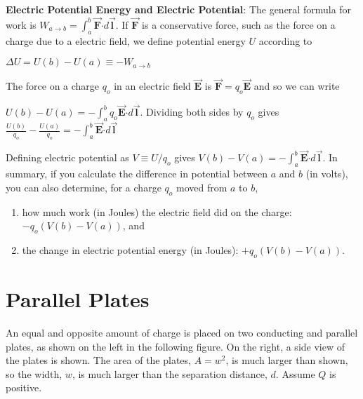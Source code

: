 \documentclass{article}
\newcommand{\ds}[0]{\displaystyle}
\newcommand{\bfvec}[1]{\vec{\mathbf{#1}}}
\newcommand{\bfcdot}[0]{\boldsymbol{\cdot}}
\begin{document}
\textbf{Electric Potential Energy and Electric Potential}: The general formula for work is $W_{a\rightarrow b}=\int_a^b \bfvec{F}\bfcdot d\bfvec{l}$. If $\bfvec{F}$ is a conservative force, such as the force on a charge due to a electric field, we define potential energy $U$ according to

$\Delta U = U(b)-U(a) \equiv -W_{a\rightarrow b}$

The force on a charge $q_o$ in an electric field $\bfvec{E}$ is $\bfvec{F}=q_o\bfvec{E}$ and so we can write

$\ds U(b)-U(a) = -\int_a^b q_o\bfvec{E}\bfcdot d\bfvec{l}$. Dividing both sides by $q_o$ gives $\ds\frac{U(b)}{q_o}-\frac{U(a)}{q_o} = -\int_a^b\bfvec{E}\bfcdot d\bfvec{l}$

Defining electric potential as $V\equiv U/q_o$ gives $V(b)-V(a) = -\int_a^b\bfvec{E}\bfcdot d\bfvec{l}$. In summary, if you calculate the difference in potential between $a$ and $b$ (in volts), you can also determine, for a charge $q_o$ moved from $a$ to $b$,

\begin{enumerate}

  \item how much work (in Joules) the electric field did on the charge: $-q_o(V(b)-V(a))$, and

  \item the change in electric potential energy (in Joules): $+q_o(V(b)-V(a))$.

\end{enumerate}

\section{Parallel Plates}

An equal and opposite amount of charge is placed on two conducting and parallel plates, as shown on the left in the following figure. On the right, a side view of the plates is shown. The area of the plates, $A = w^2$, is much larger than shown, so the width, $w$, is much larger than the separation distance, $d$. Assume $Q$ is positive.


\end{document}
